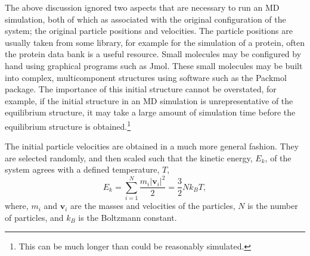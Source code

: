 The above discussion ignored two aspects that are necessary to run an MD simulation, both of which as associated with the original configuration of the system; the original particle positions and velocities.
The particle positions are usually taken from some library, for example for the simulation of a protein, often the protein data bank\autocite{noauthor_rcsb_nodate} is a useful resource.
Small molecules may be configured by hand using graphical programs such as Jmol.\autocite{noauthor_jmol_nodate}
These small molecules may be built into complex, multicomponent structures using software such as the Packmol package.\autocite{martinez_packmol_2009}
The importance of this initial structure cannot be overstated, for example, if the initial structure in an MD simulation is unrepresentative of the equilibrium structure, it may take a large amount of simulation time before the equilibrium structure is obtained.\footnote{This can be much longer than could be reasonably simulated.}

The initial particle velocities are obtained in a much more general fashion.
They are selected randomly, and then scaled such that the kinetic energy, $E_k$, of the system agrees with a defined temperature, $T$,
%
\begin{equation}
E_k = \sum_{i=1}^N{\frac{m_i|\mathbf{v}_i|^2}{2}} = \frac{3}{2}Nk_BT,
\label{equ:ek}
\end{equation}
%
where, $m_i$ and $\mathbf{v}_i$ are the masses and velocities of the particles, $N$ is the number of particles, and $k_B$ is the Boltzmann constant.

